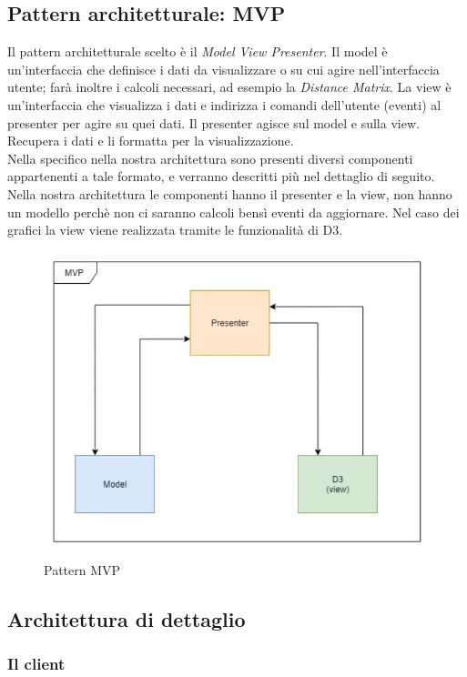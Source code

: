 \documentclass[../manuale_sviluppatore.tex]{subfiles}
\begin{document}
\subsection{Pattern architetturale: MVP}
Il pattern architetturale scelto è il \emph{Model View Presenter}. 
Il model è un'interfaccia che definisce i dati da visualizzare o su cui agire nell'interfaccia utente; farà inoltre i calcoli necessari, ad esempio la \emph{Distance Matrix}.
La view è un'interfaccia che visualizza i dati e indirizza i comandi dell'utente (eventi) al presenter per agire su quei dati.
Il presenter agisce sul model e sulla view. Recupera i dati e li formatta per la visualizzazione.\\
Nella specifico nella nostra architettura sono presenti diversi componenti appartenenti a tale formato, e verranno descritti più nel dettaglio di seguito.\\
Nella nostra architettura le componenti hanno il presenter e la view, non hanno un modello perchè non ci saranno calcoli bensì eventi da aggiornare. Nel caso dei
grafici la view viene realizzata tramite le funzionalità di D3.

\begin{figure}[H]
	\centering
	\includegraphics[width=18cm]{img/patternMVP.jpg}
	\caption{Pattern MVP}
\end{figure}

\subsection{Architettura di dettaglio}
\subsubsection{Il client}
\end{document}
